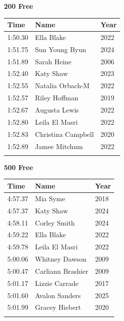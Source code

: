 \vspace{0.5em}
\noindent\begin{minipage}[t]{0.48\textwidth}
\centering
\textbf{\textcolor{teamprimary}{200 Free}}\par
\vspace{0.5em}
\centering
\small
\renewcommand{\arraystretch}{1.0}
\setlength{\tabcolsep}{4pt}
\begin{tabular}{@{}p{1.8cm}p{3.0cm}p{1.0cm}@{}}
\toprule
\textbf{Time} & \textbf{Name} & \textbf{Year} \\
\midrule
1:50.30 & Ella Blake & 2022 \\
1:51.75 & Sun Young Byun & 2024 \\
1:51.89 & Sarah Heine & 2006 \\
1:52.40 & Katy Shaw & 2023 \\
1:52.55 & Natalia Orbach-M & 2022 \\
1:52.57 & Riley Hoffman & 2019 \\
1:52.67 & Augusta Lewis & 2022 \\
1:52.80 & Leila El Masri & 2022 \\
1:52.83 & Christina Campbell & 2020 \\
1:52.89 & Jamee Mitchum & 2022 \\
\bottomrule
\vspace{0.5em}
\end{tabular}
\end{minipage}
\hfill
\begin{minipage}[t]{0.48\textwidth}
\centering
\textbf{\textcolor{teamprimary}{500 Free}}\par
\vspace{0.5em}
\centering
\small
\renewcommand{\arraystretch}{1.0}
\setlength{\tabcolsep}{4pt}
\begin{tabular}{@{}p{1.8cm}p{3.0cm}p{1.0cm}@{}}
\toprule
\textbf{Time} & \textbf{Name} & \textbf{Year} \\
\midrule
4:57.37 & Mia Syme & 2018 \\
4:57.37 & Katy Shaw & 2024 \\
4:58.11 & Corley Smith & 2024 \\
4:59.22 & Ella Blake & 2022 \\
4:59.78 & Leila El Masri & 2022 \\
5:00.06 & Whitney Dawson & 2009 \\
5:00.47 & Carliann Brashier & 2009 \\
5:01.17 & Lizzie Carrade & 2017 \\
5:01.60 & Avalon Sanders & 2025 \\
5:01.99 & Gracey Hiebert & 2020 \\
\bottomrule
\vspace{0.5em}
\end{tabular}
\end{minipage}

